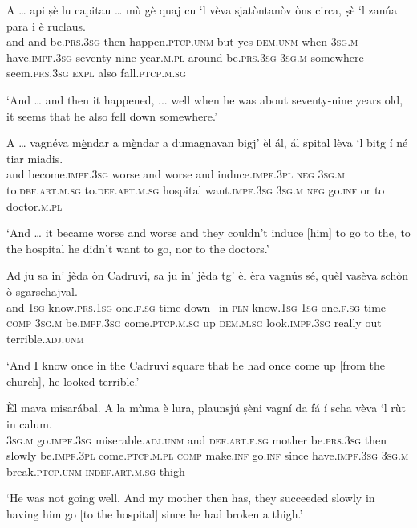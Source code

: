 \begin{linenumbers}
\gll  A … api ṣè lu capitau … mù gè quaj cu `l vèva sjatòntanòv òns circa, ṣè `l zanúa para i è ruclaus.  \\
and {} and be.\textsc{prs.3sg} then happen.\textsc{ptcp.unm} {} but yes \textsc{dem.unm} when \textsc{3sg.m} have.\textsc{impf.3sg} seventy-nine year.\textsc{m.pl} around be.\textsc{prs.3sg} \textsc{3sg.m} somewhere  seem.\textsc{prs.3sg} \textsc{expl} also fall.\textsc{ptcp.m.sg}\\
\end{linenumbers}
\medskip
\glt `And … and then it happened, ... well when he was about seventy-nine years old, it seems that he also fell down somewhere.'
\medskip

\begin{linenumbers}
\gll  A … vagnéva m\underline{è}ndar a m\underline{è}ndar a dumagnavan bigj' èl ál, ál spital lèva `l bitg í né tiar miadis.  \\
and {}  become.\textsc{impf.3sg} worse and worse and induce.\textsc{impf.3pl} \textsc{neg} \textsc{3sg.m} to.\textsc{def.art.m.sg} to.\textsc{def.art.m.sg} hospital want.\textsc{impf.3sg} \textsc{3sg.m} \textsc{neg} go.\textsc{inf} or to doctor.\textsc{m.pl} \\
\end{linenumbers}
\medskip
\glt `And … it became worse and worse and they couldn’t induce [him] to go to the, to the hospital he didn’t want to go, nor to the doctors.'
\medskip

\begin{linenumbers}
\gll  Ad ju sa in' jèda òn Cadruvi\footnotemark, sa ju in' jèda tg’ èl èra vagnús sé, quèl vasèva schòn ò ṣgarṣchajval.  \\
and \textsc{1sg} know.\textsc{prs.1sg} one.\textsc{f.sg} time down\_in \textsc{pln} know.\textsc{1sg} \textsc{1sg} one.\textsc{f.sg} time \textsc{comp} \textsc{3sg.m} be.\textsc{impf.3sg} come.\textsc{ptcp.m.sg} up \textsc{dem.m.sg} look.\textsc{impf.3sg} really out terrible.\textsc{adj.unm}\\
\end{linenumbers}
\medskip
\glt `And I know once in the Cadruvi square that he had once come up [from the church], he looked terrible.'
\medskip

\begin{linenumbers}
\gll   Èl mava misarábal. A la mùma è lura, plaunsjú ṣèni vagní da fá í scha vèva `l rùt in calum.\\
 \textsc{3sg.m} go.\textsc{impf.3sg} miserable.\textsc{adj.unm} and \textsc{def.art.f.sg} mother be.\textsc{prs.3sg} then slowly be.\textsc{impf.3pl} come.\textsc{ptcp.m.pl} \textsc{comp} make.\textsc{inf} go.\textsc{inf} since have.\textsc{impf.3sg} \textsc{3sg.m} break.\textsc{ptcp.unm} \textsc{indef.art.m.sg} thigh \\
\end{linenumbers}
\medskip
\glt `He was not going well. And my mother then has, they succeeded slowly in having him go [to the hospital] since he had broken a thigh.'
\medskip

